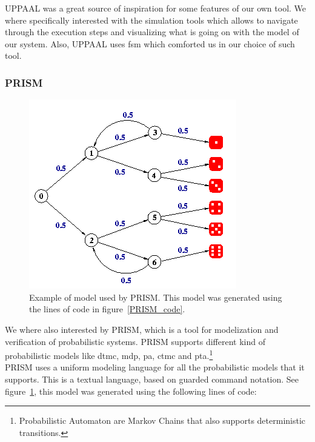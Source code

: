 \documentclass[12pt]{article}
\begin{document}
UPPAAL was a great source of inspiration for some features of our own tool. We where specifically interested with the simulation tools which allows to navigate through the execution steps and visualizing what is going on with the model of our system. Also, UPPAAL uses \gls{fsm} which comforted us in our choice of such tool.\\

\subsubsection{PRISM}

\begin{figure}
    \centering
    \includegraphics[scale=0.6]{PRISM_model.png}
    \caption{Example of model used by PRISM. This model was generated using the lines of code in figure~\ref{PRISM_code}.}
    \label{PRISM_model}
\end{figure}

We where also interested by PRISM, which is a tool for modelization and verification of probabilistic systems. PRISM supports different kind of probabilistic models like \gls{dtmc}, \gls{mdp}, \gls{pa}, \gls{ctmc} and \gls{pta}.\footnote{Probabilistic Automaton are Markov Chains that also supports deterministic transitions.}~\cite{Kwiatkowska2011}~\cite{Hinton2006}\\

PRISM uses a uniform modeling language for all the probabilistic models that it supports. This is a textual language, based on guarded command notation. See figure~\ref{PRISM_model}, this model was generated using the following lines of code:
\end{document}
